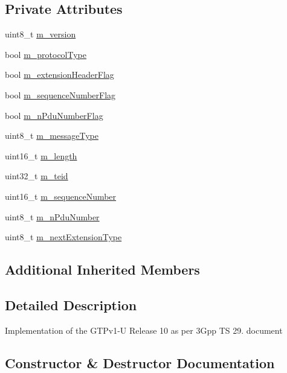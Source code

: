 \subsection*{Private Attributes}
\begin{DoxyCompactItemize}
\item 
uint8\+\_\+t \hyperlink{classns3_1_1GtpuHeader_ab0bd6fd08e361f9bb35ce1160bf8b263}{m\+\_\+version}
\item 
bool \hyperlink{classns3_1_1GtpuHeader_a48a7c185f083bc8da2ee925b4766c69f}{m\+\_\+protocol\+Type}
\item 
bool \hyperlink{classns3_1_1GtpuHeader_a30bd9a75b36836bf46574001327e9e20}{m\+\_\+extension\+Header\+Flag}
\item 
bool \hyperlink{classns3_1_1GtpuHeader_ae659c2713a5a90d90312a329827f1f07}{m\+\_\+sequence\+Number\+Flag}
\item 
bool \hyperlink{classns3_1_1GtpuHeader_a2b5367fdc1e0be87bcd9b9911853a64e}{m\+\_\+n\+Pdu\+Number\+Flag}
\item 
uint8\+\_\+t \hyperlink{classns3_1_1GtpuHeader_a5295b542b750d59ed3dd62cfa33e1413}{m\+\_\+message\+Type}
\item 
uint16\+\_\+t \hyperlink{classns3_1_1GtpuHeader_ab6f0dc585ae24ecbdc8dc8fb12bcf54f}{m\+\_\+length}
\item 
uint32\+\_\+t \hyperlink{classns3_1_1GtpuHeader_a2245b21ba4c0c28116fa3099b9cb1f44}{m\+\_\+teid}
\item 
uint16\+\_\+t \hyperlink{classns3_1_1GtpuHeader_a819665f22b6dfc6492799edf4984db53}{m\+\_\+sequence\+Number}
\item 
uint8\+\_\+t \hyperlink{classns3_1_1GtpuHeader_a807ca692a4cfc9124abf02544f3d096a}{m\+\_\+n\+Pdu\+Number}
\item 
uint8\+\_\+t \hyperlink{classns3_1_1GtpuHeader_a0fd669943a74011403a8be717e7f41c0}{m\+\_\+next\+Extension\+Type}
\end{DoxyCompactItemize}
\subsection*{Additional Inherited Members}


\subsection{Detailed Description}
Implementation of the G\+T\+Pv1-\/U Release 10 as per 3\+Gpp TS 29. document 

\subsection{Constructor \& Destructor Documentation}
